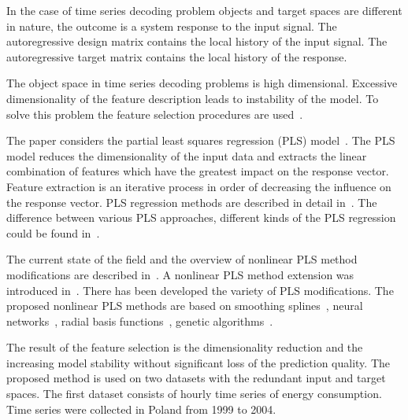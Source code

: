 \documentclass[12pt,twoside]{article}
\begin{document}
In the case of time series decoding problem objects and target spaces are different in nature, the outcome is a system response to the input signal.
The autoregressive design matrix contains the local history of the input signal.
The autoregressive target matrix contains the local history of the response.

The object space in time series decoding problems is high dimensional.
Excessive dimensionality of the feature description leads to instability of the model.
To solve this problem the feature selection procedures are used~\cite{katrutsa2015qpfs,li2016feature}.

The paper considers the partial least squares regression (PLS) model~\cite{wegelin2000survey,abdi2003pls,geladi1986partial}.
The PLS model reduces the dimensionality of the input data and extracts the linear combination of features which have the greatest impact on the response vector.
Feature extraction is an iterative process in order of decreasing the influence on the response vector.
PLS regression methods are described in detail in~\cite{geladi1988pls, hoskuldsson1988plsr,de1993simpls}.
The difference between various PLS approaches, different kinds of the PLS regression could be found in~\cite{rosipal2006overview}.

The current state of the field and the overview of nonlinear PLS method modifications are described in~\cite{rosipal2011npls}.
A nonlinear PLS method extension was introduced in~\cite{wold1989nonlinear}.
There has been developed the variety of PLS modifications.
The proposed nonlinear PLS methods are based on smoothing splines~\cite{frank1990npls}, neural networks~\cite{qin1992npls}, radial basis functions~\cite{yan2003geneticpls}, genetic algorithms~\cite{hiden1998geneticpls}.

The result of the feature selection is the dimensionality reduction and the increasing model stability without significant loss of the prediction quality.
The proposed method is used on two datasets with the redundant input and target spaces.
The first dataset consists of hourly time series of energy consumption. 
Time series were collected in Poland from 1999 to 2004.
\end{document}
